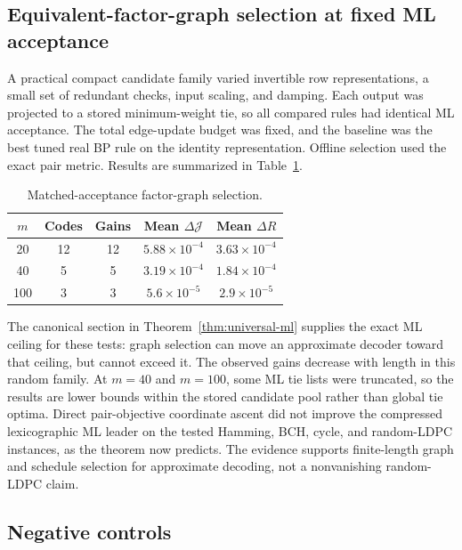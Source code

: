 \documentclass[journal]{IEEEtran}
\theoremstyle{definition}
\theoremstyle{remark}
\begin{document}
\subsection{Equivalent-factor-graph selection at fixed ML acceptance}

A practical compact candidate family varied invertible row representations,
a small set of redundant checks, input scaling, and damping.  Each output was
projected to a stored minimum-weight tie, so all compared rules had identical
ML acceptance.  The total edge-update budget was fixed, and the baseline was
the best tuned real BP rule on the identity representation.  Offline selection
used the exact pair metric.  Results are summarized in
Table~\ref{tab:graph-selection}.

\begin{table}[t]
\centering
\caption{Matched-acceptance factor-graph selection.}
\label{tab:graph-selection}
\begin{tabular}{@{}ccccc@{}}
\toprule
$m$ & Codes & Gains & Mean $\Delta\mathcal J$ & Mean $\Delta R$\\
\midrule
20  & 12 & 12 & $5.88\!\times\!10^{-4}$ & $3.63\!\times\!10^{-4}$\\
40  & 5  & 5  & $3.19\!\times\!10^{-4}$ & $1.84\!\times\!10^{-4}$\\
100 & 3  & 3  & $5.6\!\times\!10^{-5}$ & $2.9\!\times\!10^{-5}$\\
\bottomrule
\end{tabular}
\end{table}

The canonical section in Theorem~\ref{thm:universal-ml} supplies the exact ML
ceiling for these tests: graph selection can move an approximate decoder
toward that ceiling, but cannot exceed it.  The observed gains decrease with
length in this random family.  At $m=40$ and $m=100$, some ML tie lists were
truncated, so the results are lower bounds within the stored candidate pool
rather than global tie optima.  Direct pair-objective coordinate ascent did
not improve the compressed lexicographic ML leader on the tested Hamming,
BCH, cycle, and random-LDPC instances, as the theorem now predicts.  The
evidence supports finite-length graph and schedule selection for approximate
decoding, not a nonvanishing random-LDPC claim.

\subsection{Negative controls}
\end{document}
